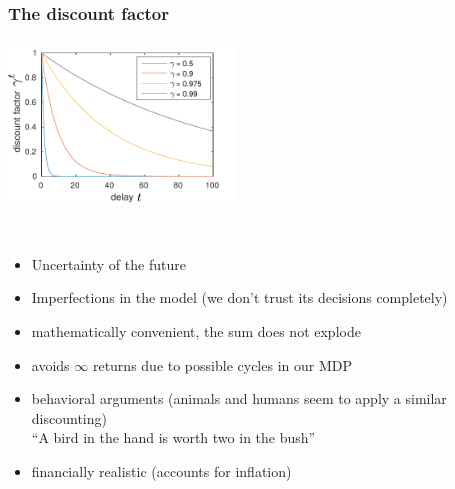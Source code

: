 \begin{frame}\frametitle{The discount factor}
 


\begin{center}
\includegraphics[width=6cm]{img/delay_discount}
\label{fig:discount}
\end{center}

\slidesonly{\vspace{-3mm}}

\end{frame}

\begin{frame}

\\

\pause

\begin{itemize}
\item Uncertainty of the future
\item Imperfections in the model (we don't trust its decisions completely)
\item mathematically convenient, the sum does not explode
\item avoids $\infty$ returns due to possible cycles in our MDP
\item behavioral arguments (animals and humans seem to apply a similar discounting)\\
``A bird in the hand is worth two in the bush''
\item financially realistic (accounts for inflation)
\end{itemize}

\end{frame} 


